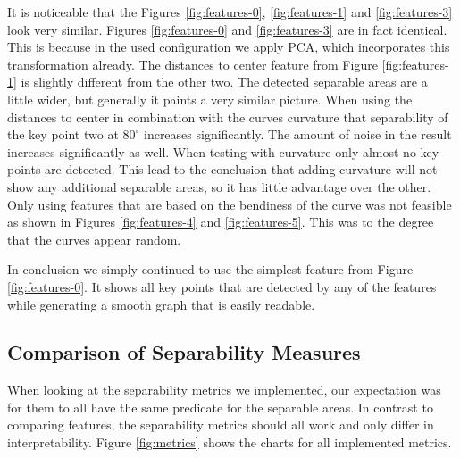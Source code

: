 \documentclass[pdftex,12pt,a4paper]{report}
\begin{document}
It is noticeable that the Figures \ref{fig:features-0}, \ref{fig:features-1} and \ref{fig:features-3} look very similar. Figures \ref{fig:features-0} and \ref{fig:features-3} are in fact identical. This is because in the used configuration we apply PCA, which incorporates this transformation already. The distances to center feature from Figure \ref{fig:features-1} is slightly different from the other two. The detected separable areas are a little wider, but generally it paints a very similar picture. When using the distances to center in combination with the curves curvature that separability of the key point two at $80^\circ$ increases significantly. The amount of noise in the result increases significantly as well. When testing with curvature only almost no key-points are detected. This lead to the conclusion that adding curvature will not show any additional separable areas, so it has little advantage over the other. Only using features that are based on the bendiness of the curve was not feasible as shown in Figures \ref{fig:features-4} and \ref{fig:features-5}. This was to the degree that the curves appear random.

In conclusion we simply continued to use the simplest feature from Figure \ref{fig:features-0}. It shows all key points that are detected by any of the features while generating a smooth graph that is easily readable.

\subsection{Comparison of Separability Measures}

When looking at the separability metrics we implemented, our expectation was for them to all have the same predicate for the separable areas. In contrast to comparing features, the separability metrics should all work and only differ in interpretability. Figure \ref{fig:metrics} shows the charts for all implemented metrics.
\end{document}
